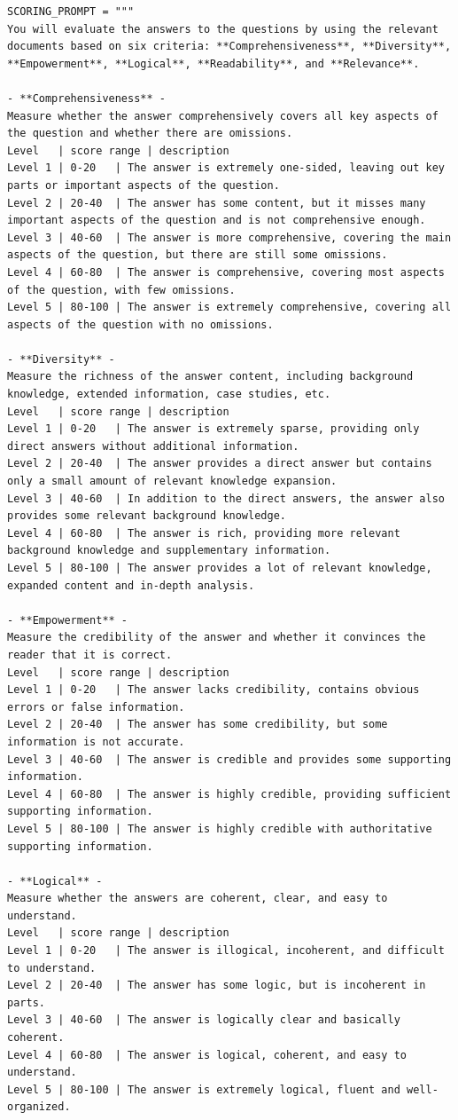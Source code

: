 \documentclass{article} %
\begin{document}
\begin{lstlisting}
SCORING_PROMPT = """
You will evaluate the answers to the questions by using the relevant documents based on six criteria: **Comprehensiveness**, **Diversity**, **Empowerment**, **Logical**, **Readability**, and **Relevance**.

- **Comprehensiveness** -
Measure whether the answer comprehensively covers all key aspects of the question and whether there are omissions.
Level   | score range | description
Level 1 | 0-20   | The answer is extremely one-sided, leaving out key parts or important aspects of the question.
Level 2 | 20-40  | The answer has some content, but it misses many important aspects of the question and is not comprehensive enough.
Level 3 | 40-60  | The answer is more comprehensive, covering the main aspects of the question, but there are still some omissions.
Level 4 | 60-80  | The answer is comprehensive, covering most aspects of the question, with few omissions.
Level 5 | 80-100 | The answer is extremely comprehensive, covering all aspects of the question with no omissions.

- **Diversity** -
Measure the richness of the answer content, including background knowledge, extended information, case studies, etc.
Level   | score range | description
Level 1 | 0-20   | The answer is extremely sparse, providing only direct answers without additional information.
Level 2 | 20-40  | The answer provides a direct answer but contains only a small amount of relevant knowledge expansion.
Level 3 | 40-60  | In addition to the direct answers, the answer also provides some relevant background knowledge.
Level 4 | 60-80  | The answer is rich, providing more relevant background knowledge and supplementary information.
Level 5 | 80-100 | The answer provides a lot of relevant knowledge, expanded content and in-depth analysis.

- **Empowerment** -
Measure the credibility of the answer and whether it convinces the reader that it is correct.
Level   | score range | description
Level 1 | 0-20   | The answer lacks credibility, contains obvious errors or false information.
Level 2 | 20-40  | The answer has some credibility, but some information is not accurate.
Level 3 | 40-60  | The answer is credible and provides some supporting information.
Level 4 | 60-80  | The answer is highly credible, providing sufficient supporting information.
Level 5 | 80-100 | The answer is highly credible with authoritative supporting information.

- **Logical** -
Measure whether the answers are coherent, clear, and easy to understand.
Level   | score range | description
Level 1 | 0-20   | The answer is illogical, incoherent, and difficult to understand.
Level 2 | 20-40  | The answer has some logic, but is incoherent in parts.
Level 3 | 40-60  | The answer is logically clear and basically coherent.
Level 4 | 60-80  | The answer is logical, coherent, and easy to understand.
Level 5 | 80-100 | The answer is extremely logical, fluent and well-organized.


\end{lstlisting}
\end{document}
